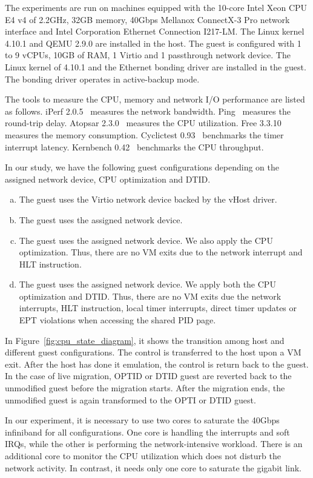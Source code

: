 
The experiments are run on machines equipped with the 10-core
Intel Xeon CPU E4 v4 of 2.2GHz, 32GB memory, 40Gbps Mellanox
ConnectX-3 Pro network interface and Intel Corporation
Ethernet Connection I217-LM. The Linux kernel 4.10.1 and QEMU
2.9.0 are installed in the host. The guest is configured with
1 to 9 vCPUs, 10GB of RAM, 1 Virtio and 1 passthrough network
device. The Linux kernel of 4.10.1 and the Ethernet bonding
driver are installed in the guest. The bonding driver operates
in active-backup mode.

The tools to measure the CPU, memory and network I/O
performance are listed as follows. iPerf 2.0.5~\cite{iperf}
measures the network bandwidth. Ping~\cite{ping} measures the
round-trip delay. Atopsar 2.3.0~\cite{atopsar} measures the
CPU utilization. Free 3.3.10~\cite{free} measures the memory
consumption. Cyclictest 0.93~\cite{cyclictest} benchmarks the
timer interrupt latency. Kernbench 0.42~\cite{kernbench}
benchmarks the CPU throughput.

In our study, we have the following guest configurations
depending on the assigned network device, CPU optimization and
DTID.
\begin{enumerate}[(a)]
  \item The guest uses the Virtio network device backed by the
  vHost driver.
  \item The guest uses the assigned network device.
  \item The guest uses the assigned network device. We also
  apply the CPU optimization. Thus, there are no VM exits due
  to the network interrupt and HLT instruction.
  \item The guest uses the assigned network device. We apply
  both the CPU optimization and DTID. Thus, there are no VM
  exits due the network interrupts, HLT instruction, local
  timer interrupts, direct timer updates or EPT violations
  when accessing the shared PID page.
  \end{enumerate}
In Figure~\ref{fig:cpu_state_diagram}, it shows the transition
among host and different guest configurations. The control is
transferred to the host upon a VM exit. After the host has
done it emulation, the control is return back to the guest. In
the case of live migration, OPTID or DTID guest are reverted
back to the unmodified guest before the migration starts.
After the migration ends, the unmodified guest is again
transformed to the OPTI or DTID guest.

In our experiment, it is necessary to use two cores to
saturate the 40Gbps infiniband for all configurations. One
core is handling the interrupts and soft IRQs, while the other
is performing the network-intensive workload. There is an
additional core to monitor the CPU utilization which does not
disturb the network activity. In contrast, it needs only one
core to saturate the gigabit link.
